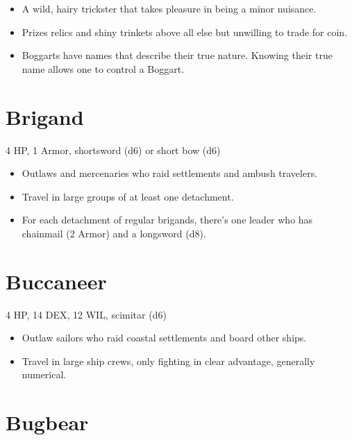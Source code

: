 \documentclass[
  10pt,
  american,
]{article}
\begin{document}
\begin{samepage}
\begin{itemize}
\setlength\itemsep{-.5em}
\item A wild, hairy trickster that takes pleasure in being a minor nuisance.
\item Prizes relics and shiny trinkets above all else but unwilling to trade for coin.
\item Boggarts have names that describe their true nature. Knowing their true name allows one to control a Boggart.
\end{itemize}
\end{samepage}

\hypertarget{brigand}{%
\section{Brigand}\label{brigand}}

4 HP, 1 Armor, shortsword (d6) or short bow (d6)

\begin{samepage}
\begin{itemize}
\setlength\itemsep{-.5em}
\item Outlaws and mercenaries who raid settlements and ambush travelers.
\item Travel in large groups of at least one detachment.
\item For each detachment of regular brigands, there’s one leader who has chainmail (2 Armor) and a longsword (d8).
\end{itemize}
\end{samepage}

\hypertarget{buccaneer}{%
\section{Buccaneer}\label{buccaneer}}

4 HP, 14 DEX, 12 WIL, scimitar (d6)

\begin{samepage}
\begin{itemize}
\setlength\itemsep{-.5em}
\item Outlaw sailors who raid coastal settlements and board other ships.
\item Travel in large ship crews, only fighting in clear advantage, generally numerical.
\end{itemize}
\end{samepage}

\hypertarget{bugbear}{%
\section{Bugbear}\label{bugbear}}
\end{document}
